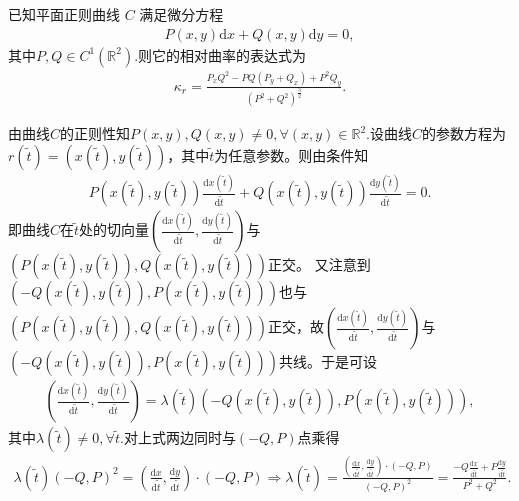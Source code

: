 \documentclass[../../main.tex]{subfiles}%
\begin{document}
\begin{proposition}\label{proposition:满足微分方程的曲线的相对曲率}
已知平面正则曲线 $C$ 满足微分方程
\begin{align*}
P(x,y)\mathrm{d}x+Q(x,y)\mathrm{d}y=0,
\end{align*}
其中$P,Q\in C^1(\mathbb{R}^2)$.则它的相对曲率的表达式为
\begin{align*}
\kappa_r=\frac{P_xQ^2-PQ(P_y+Q_x)+P^2Q_y}{(P^2+Q^2)^{\frac{3}{2}}}.
\end{align*}
\end{proposition}
\begin{solution}

由曲线$C$的正则性知$P(x,y),Q(x,y)\neq0,\forall(x,y)\in\mathbb{R}^2.$设曲线$C$的参数方程为$r(\tilde{t})=(x(\tilde{t}),y(\tilde{t}))$，其中$\tilde{t}$为任意参数。则由条件知
\begin{align*}
P(x(\tilde{t}),y(\tilde{t}))\frac{\mathrm{d}x(\tilde{t})}{\mathrm{d}\tilde{t}}+Q(x(\tilde{t}),y(\tilde{t}))\frac{\mathrm{d}y(\tilde{t})}{\mathrm{d}\tilde{t}}=0.
\end{align*}
即曲线$C$在$\tilde{t}$处的切向量$(\frac{\mathrm{d}x(\tilde{t})}{\mathrm{d}\tilde{t}},\frac{\mathrm{d}y(\tilde{t})}{\mathrm{d}\tilde{t}})$与$(P(x(\tilde{t}),y(\tilde{t})),Q(x(\tilde{t}),y(\tilde{t})))$正交。
又注意到$(-Q(x(\tilde{t}),y(\tilde{t})),P(x(\tilde{t}),y(\tilde{t})))$也与$(P(x(\tilde{t}),y(\tilde{t})),Q(x(\tilde{t}),y(\tilde{t})))$正交，故$(\frac{\mathrm{d}x(\tilde{t})}{\mathrm{d}\tilde{t}},\frac{\mathrm{d}y(\tilde{t})}{\mathrm{d}\tilde{t}})$与$(-Q(x(\tilde{t}),y(\tilde{t})),P(x(\tilde{t}),y(\tilde{t})))$共线。于是可设
\begin{align*}
\left(\frac{\mathrm{d}x(\tilde{t})}{\mathrm{d}\tilde{t}},\frac{\mathrm{d}y(\tilde{t})}{\mathrm{d}\tilde{t}}\right)=\lambda(\tilde{t})\left(-Q(x(\tilde{t}),y(\tilde{t})),P(x(\tilde{t}),y(\tilde{t}))\right),
\end{align*}
其中$\lambda(\tilde{t})\neq 0,\forall \tilde{t}$.对上式两边同时与$(-Q,P)$点乘得
\begin{align*}
\lambda \left( \tilde{t} \right) \left( -Q,P \right) ^2=\left( \frac{\mathrm{d}x}{\mathrm{d}\tilde{t}},\frac{\mathrm{d}y}{\mathrm{d}\tilde{t}} \right) \cdot \left( -Q,P \right) \Longrightarrow \lambda \left( \tilde{t} \right) =\frac{\left( \frac{\mathrm{d}x}{\mathrm{d}\tilde{t}},\frac{\mathrm{d}y}{\mathrm{d}\tilde{t}} \right) \cdot \left( -Q,P \right)}{\left( -Q,P \right) ^2}=\frac{-Q\frac{\mathrm{d}x}{\mathrm{d}\tilde{t}}+P\frac{\mathrm{d}y}{\mathrm{d}\tilde{t}}}{P^2+Q^2}.
\end{align*}

\end{solution}
\end{document}

